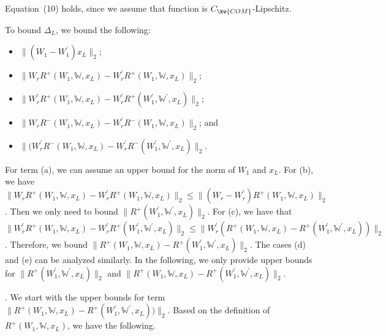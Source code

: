 Equation~(10) holds, since we assume that 
 function  is $C_{\kw{COM}}$-Lipschitz.
 
 


To bound $\Delta_{L}$, 
we bound the following:
\begin{itemize}
\item[(a)] $\|(W_{1}{-}W_{1}^{\prime})x_{L}\|_{2}$;
\item[(b)]  $\|W_rR^+(W_{1},\mathds{W},x_{L}){-}W_r^{\prime}R^+(W_{1},\mathds{W},x_{L})\|_{2}$;
\item[(c)]  $\|W^{\prime}_rR^+(W_{1},\mathds{W},x_{L}){-}W_r^{\prime}R^+(W_{1}^{\prime},\mathds{W}^{\prime},x_{L})\|_{2}$;
\item[(d)]  $\|W_rR^-(W_{1},\mathds{W},x_{L})-W_r^{\prime}R^-(W_{1},\mathds{W},x_{L})\|_{2}$;
and 
\item[(e)]  $\|(W^{\prime}_rR^-(W_{1},\mathds{W},x_{L}){-}W_r^{\prime}R^-(W_{1}^{\prime},\mathds{W}^{\prime},x_{L})\|_{2}$.
\end{itemize}

For term (a), we can assume an upper bound
for the norm of $W_1$ and $x_L$. 
For (b), 
we have 
$\|W_rR^+(W_{1},\mathds{W},x_{L})-W_r^{\prime}R^+(W_{1},\mathds{W},x_{L})\|_{2}
\leq \|(W_r-W_r^{\prime})R^+(W_{1},\mathds{W},x_{L})\|_{2}$.
Then we only need to bound $\|R^+(W_{1}^{\prime},\mathds{W}^{\prime},x_{L})\|_{2}$.
For (c), 
we have that 
$\|W^{\prime}_rR^+(W_{1},\mathds{W},x_{L})-W_r^{\prime}R^+(W_{1}^{\prime},\mathds{W}^{\prime},x_{L})\|_{2}
\leq \|W^{\prime}_r(R^+(W_{1},\mathds{W},x_{L})-R^+(W_{1}^{\prime},\mathds{W}^{\prime},x_{L}))\|_{2}$.
Therefore, we bound 
$\|R^+(W_{1},\mathds{W},x_{L})-R^+(W_{1}^{\prime},\mathds{W}^{\prime},x_{L})\|_{2}$.
The cases (d) and (e) can be analyzed similarly.
In the following, we only provide
upper bounds for $\|R^+(W_{1}^{\prime},\mathds{W}^{\prime},x_{L})\|_{2}$
and $\|R^+(W_{1},\mathds{W},x_{L})-R^+(W_{1}^{\prime},\mathds{W}^{\prime},x_{L})\|_{2}$.

\vspace{2ex}



.
We start with the upper bounds for term $\|R^+(W_{1},\mathds{W},x_{L})-R^+(W_{1}^{\prime},\mathds{W}^{\prime},x_{L}))\|_{2}$.
Based on the definition of 
$R^+(W_{1},\mathds{W},x_{L})$, we have the following.


